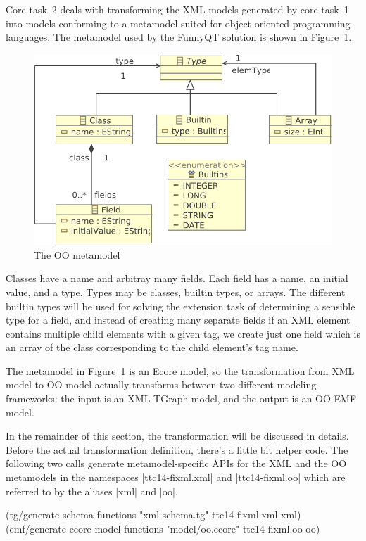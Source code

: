 \documentclass[a4paper]{article}
\newcommand{\code}{\clojureinline}
\begin{document}
Core task~2 deals with transforming the XML models generated by core task~1
into models conforming to a metamodel suited for object-oriented programming
languages.  The metamodel used by the FunnyQT solution is shown in
Figure~\ref{fig:oo-mm}.

\begin{figure}[h!t]
  \centering
  \includegraphics[width=.6\textwidth]{../model/oo}
  \caption{The OO metamodel}
  \label{fig:oo-mm}
\end{figure}

Classes have a name and arbitray many fields.  Each field has a name, an
initial value, and a type.  Types may be classes, builtin types, or arrays.
The different builtin types will be used for solving the extension task of
determining a sensible type for a field, and instead of creating many separate
fields if an XML element contains multiple child elements with a given tag, we
create just one field which is an array of the class corresponding to the child
element's tag name.

The metamodel in Figure~\ref{fig:oo-mm} is an Ecore model, so the
transformation from XML model to OO model actually transforms between two
different modeling frameworks: the input is an XML TGraph model, and the output
is an OO EMF model.

In the remainder of this section, the transformation will be discussed in
details.  Before the actual transformation definition, there's a little bit
helper code.  The following two calls generate metamodel-specific APIs for the
XML and the OO metamodels in the namespaces \code|ttc14-fixml.xml| and
\code|ttc14-fixml.oo| which are referred to by the aliases \code|xml| and
\code|oo|.

\begin{clojurecode}
(tg/generate-schema-functions       "xml-schema.tg"  ttc14-fixml.xml xml)
(emf/generate-ecore-model-functions "model/oo.ecore" ttc14-fixml.oo  oo)
\end{clojurecode}
\end{document}
